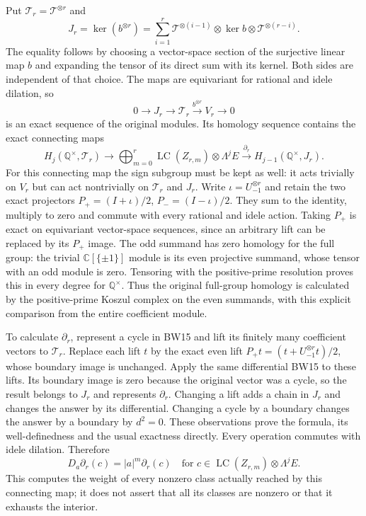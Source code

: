 \documentclass[11pt]{article}
\newcommand{\C}{\mathbb C}
\newcommand{\Q}{\mathbb Q}
\newcommand{\LC}{\operatorname{LC}}
\begin{document}
Put $\mathcal T_r=\mathcal T^{\otimes r}$ and
\[
 J_r=\ker(b^{\otimes r})
 =\sum_{i=1}^r\mathcal T^{\otimes(i-1)}\otimes\ker b
                    \otimes\mathcal T^{\otimes(r-i)}.
 \tag{BW18}
\]
The equality follows by choosing a vector-space section of the
surjective linear map $b$ and expanding the tensor of its direct
sum with its kernel. Both sides are independent of that choice.
The maps are equivariant for rational and idele dilation, so
\[
 0\longrightarrow J_r\longrightarrow\mathcal T_r
       \xrightarrow{b^{\otimes r}}V_r\longrightarrow0
 \tag{BW19}
\]
is an exact sequence of the original modules. Its homology sequence
contains the exact connecting maps
\[
 H_j(\Q^\times,\mathcal T_r)\longrightarrow
 \bigoplus_{m=0}^r\LC(Z_{r,m})\otimes\Lambda^jE
 \xrightarrow{\partial_r}H_{j-1}(\Q^\times,J_r).
 \tag{BW20}
\]
For this connecting map the sign subgroup must be kept as well:
it acts trivially on $V_r$ but can act nontrivially on
$\mathcal T_r$ and $J_r$. Write $\iota=U_{-1}^{\otimes r}$ and
retain the two exact projectors
$P_+=(I+\iota)/2$, $P_-=(I-\iota)/2$.
They sum to the identity, multiply to zero and commute with
every rational and idele action. Taking $P_+$ is exact on
equivariant vector-space sequences, since an arbitrary lift can
be replaced by its $P_+$ image. The odd summand has zero
homology for the full group: the trivial $\C[\{\pm1\}]$ module
is its even projective summand, whose tensor with an odd module
is zero. Tensoring with the positive-prime resolution proves
this in every degree for $\Q^\times$.
Thus the original full-group homology is calculated by the
positive-prime Koszul complex on the even summands, with this
explicit comparison from the entire coefficient module.

To calculate $\partial_r$, represent a cycle in BW15 and lift
its finitely many coefficient vectors to $\mathcal T_r$.
Replace each lift $t$ by the exact even lift
$P_+t=(t+U_{-1}^{\otimes r}t)/2$, whose boundary image is unchanged.
Apply the same differential BW15 to these lifts.
Its boundary image is zero because the original vector was a
cycle, so the result belongs to $J_r$ and represents
$\partial_r$. Changing a lift adds a chain in $J_r$ and changes
the answer by its differential. Changing a cycle by a boundary
changes the answer by a boundary by $d^2=0$. These observations
prove the formula, its well-definedness and the usual exactness
directly. Every operation commutes with idele dilation. Therefore
\[
 D_a\partial_r(c)=|a|^m\partial_r(c)
 \quad\text{for }c\in\LC(Z_{r,m})\otimes\Lambda^jE.
 \tag{BW21}
\]
This computes the weight of every nonzero class actually reached
by this connecting map; it does not assert that all its classes
are nonzero or that it exhausts the interior.
\end{document}
